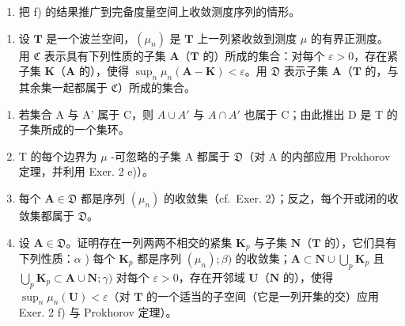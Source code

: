 \begin{enumerate}
\def\labelenumi{\alph{enumi})}
\setcounter{enumi}{6}
\tightlist
\item
  把 f) 的结果推广到完备度量空间上收敛测度序列的情形。
\end{enumerate}

\begin{enumerate}
\def\labelenumi{\arabic{enumi})}
\setcounter{enumi}{2}
\tightlist
\item
  设 \(\mathbf{T}\) 是一个波兰空间，\((\mu_n)\) 是 \(\mathbf{T}\) 上一列紧收敛到测度 \(\mu\) 的有界正测度。用 \(\mathfrak{C}\) 表示具有下列性质的子集 \(\mathbf{A}\)（\(\mathbf{T}\) 的）所成的集合：对每个 \(\varepsilon > 0\)，存在紧子集 \(\mathbf{K}\)（\(\mathbf{A}\) 的），使得 \(\sup_{n} \mu_n(\mathbf{A} - \mathbf{K}) < \varepsilon\)。用 \(\mathfrak{D}\) 表示子集 \(\mathbf{A}\)（\(\mathbf{T}\) 的，与其余集一起都属于 \(\mathfrak{C}\)）所成的集合。
\end{enumerate}

\begin{enumerate}
\def\labelenumi{\alph{enumi})}
\item
  若集合 A 与 A' 属于 C，则 \(A \cup A'\) 与 \(A \cap A'\) 也属于 C；由此推出 D 是 T 的子集所成的一个集环。
\item
  T 的每个边界为 \(\mu\) -可忽略的子集 A 都属于 \(\mathfrak{D}\)（对 A 的内部应用 Prokhorov 定理，并利用 Exer. 2 e)）。
\item
  每个 \(\mathbf{A} \in \mathfrak{D}\) 都是序列 \((\mu_n)\) 的收敛集（cf.~Exer. 2）；反之，每个开或闭的收敛集都属于 \(\mathfrak{D}\)。
\item
  设 \(\mathbf{A} \in \mathfrak{D}\)。证明存在一列两两不相交的紧集 \(\mathbf{K}_p\) 与子集 \(\mathbf{N}\)（\(\mathbf{T}\) 的），它们具有下列性质：\(\alpha\) ) 每个 \(\mathbf{K}_p\) 都是序列 \((\mu_n); \beta)\) 的收敛集；\(\mathbf{A} \subset \mathbf{N} \cup \bigcup_{p} \mathbf{K}_p\) 且 \(\bigcup_{p} \mathbf{K}_p \subset \mathbf{A} \cup \mathbf{N}; \gamma)\) 对每个 \(\varepsilon > 0\)，存在开邻域 \(\mathbf{U}\)（\(\mathbf{N}\) 的），使得 \(\sup_{n}\mu_n(\mathbf{U}) < \varepsilon\)（对 \(\mathbf{T}\) 的一个适当的子空间（它是一列开集的交）应用 Exer. 2 f) 与 Prokhorov 定理）。
\end{enumerate}

